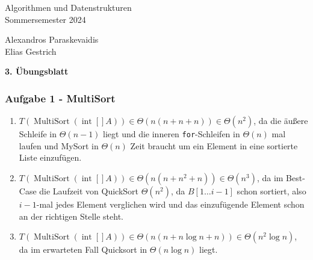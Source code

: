 \documentclass[11pt]{scrartcl}
\newcommand{\sheetNum}{3} %
\newcommand{\studentOne}{Alexandros Paraskevaidis} %
\newcommand{\studentTwo}{Elias Gestrich} %
\newcommand{\task}[1]{\subsubsection*{#1}}
\begin{document}
\begin{small}
\begin{minipage}{0.5 \linewidth}
  Algorithmen und Datenstrukturen\\
  Sommersemester 2024
\end{minipage}
\begin{minipage}{0.5\linewidth}
  \begin{flushright}
    \studentOne\\
    \studentTwo
  \end{flushright}
\end{minipage}
\end{small}
\begin{center}
\begin{sffamily}\Large\bfseries \sheetNum. Übungsblatt\end{sffamily}
\end{center}


\task{Aufgabe 1 - MultiSort}
\begin{enumerate}[label=\alph*)]
	\item $ T(\operatorname{MultiSort}(\operatorname{int}[] A)) \in \Theta( n(n + n + n)) \in \Theta(n^2) $, da die äußere Schleife in $ \Theta(n - 1) $ liegt und die inneren \verb|for|-Schleifen in $ \Theta(n) $ mal laufen und MySort in $ \Theta(n) $ Zeit braucht um ein Element in eine sortierte Liste einzufügen.
	\item $ T(\operatorname{MultiSort}\left( \operatorname{int}[] A \right)) \in \Theta(n ( n + n^2 + n)) \in \Theta(n^3) $, da im Best-Case die Laufzeit von QuickSort $ \Theta (n^2) $, da $ B[1\dotsc i-1] $ schon sortiert, also $ i-1 $-mal jedes Element verglichen wird und das einzufügende Element schon an der richtigen Stelle steht.
	\item $ T ( \operatorname{MultiSort}\left( \operatorname{int}[] A \right)) \in \Theta(n ( n + n \log n + n)) \in \Theta(n^2 \log n) $, da im erwarteten Fall Quicksort in $ \Theta(n \log n) $ liegt.
\end{enumerate}
\end{document}
